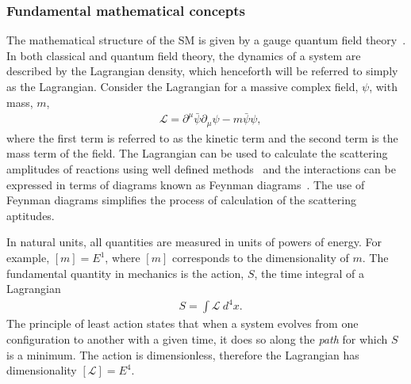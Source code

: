 \subsubsection{Fundamental mathematical concepts}
The mathematical structure of the SM is given by a gauge quantum field theory~\cite{Peskin1995}. In both classical and quantum field theory, the dynamics of a system are described by the Lagrangian density, which henceforth will be referred to simply as the Lagrangian. Consider the Lagrangian for a massive complex field, $\psi$, with mass, $m$, 
\begin{equation}
    \label{eq:lagrangian_example}
    \begin{aligned}
        & \mathcal{L} = \partial^\mu\bar{\psi}\partial_\mu\psi - m\bar{\psi}\psi,
    \end{aligned}
\end{equation}
where the first term is referred to as the kinetic term and the second term is the mass term of the field. The Lagrangian can be used to calculate the scattering amplitudes of reactions using well defined methods~\cite{Lehmann1955} and the interactions can be expressed in terms of diagrams known as Feynman diagrams~\cite{Thomson:2013zua}. The use of Feynman diagrams simplifies the process of calculation of the scattering aptitudes.

In natural units, all quantities are measured in units of powers of energy. For example, $[m] = E^1$, where $[m]$ corresponds to the dimensionality of $m$. The fundamental quantity in mechanics is the action, $S$, the time integral of a Lagrangian~\cite{Peskin1995}
\begin{equation}
    \label{eq:action}
    \begin{aligned}
        & S = \int \mathcal{L}~d^4x.
    \end{aligned}
\end{equation}
The principle of least action states that when a system evolves from one configuration to another with a given time, it does so along the \emph{path} for which $S$ is a minimum. The action is dimensionless, therefore the Lagrangian has dimensionality $[\mathcal{L}] = E^4$.

